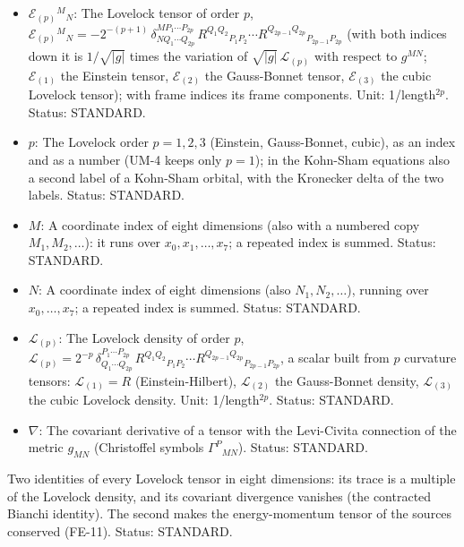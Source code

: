 \documentclass[
  10pt,
]{article}
\providecommand{\tightlist}{%
  \setlength{\itemsep}{0pt}\setlength{\parskip}{0pt}}
\begin{document}
\begin{itemize}
\tightlist
\item
  \(\mathcal{E}_{(p)}{}^M{}_N\): The Lovelock tensor of order \(p\),
  \(\mathcal{E}_{(p)}{}^M{}_N = -2^{-(p+1)}\,\delta^{MP_1\cdots P_{2p}}_{NQ_1\cdots Q_{2p}}\,R^{Q_1Q_2}{}_{P_1P_2}\cdots R^{Q_{2p-1}Q_{2p}}{}_{P_{2p-1}P_{2p}}\)
  (with both indices down it is \(1/\sqrt{\lvert g\rvert}\) times the
  variation of \(\sqrt{\lvert g\rvert}\,\mathcal{L}_{(p)}\) with respect
  to \(g^{MN}\); \(\mathcal{E}_{(1)}\) the Einstein tensor,
  \(\mathcal{E}_{(2)}\) the Gauss-Bonnet tensor, \(\mathcal{E}_{(3)}\)
  the cubic Lovelock tensor); with frame indices its frame components.
  Unit: 1/length\(^{2p}\). Status: STANDARD.
\item
  \(p\): The Lovelock order \(p = 1, 2, 3\) (Einstein, Gauss-Bonnet,
  cubic), as an index and as a number (UM-4 keeps only \(p = 1\)); in
  the Kohn-Sham equations also a second label of a Kohn-Sham orbital,
  with the Kronecker delta of the two labels. Status: STANDARD.
\item
  \(M\): A coordinate index of eight dimensions (also with a numbered
  copy \(M_1, M_2, \dots\)): it runs over \(x_0, x_1, \dots, x_7\); a
  repeated index is summed. Status: STANDARD.
\item
  \(N\): A coordinate index of eight dimensions (also
  \(N_1, N_2, \dots\)), running over \(x_0, \dots, x_7\); a repeated
  index is summed. Status: STANDARD.
\item
  \(\mathcal{L}_{(p)}\): The Lovelock density of order \(p\),
  \(\mathcal{L}_{(p)} = 2^{-p}\,\delta^{P_1\cdots P_{2p}}_{Q_1\cdots Q_{2p}}\,R^{Q_1Q_2}{}_{P_1P_2}\cdots R^{Q_{2p-1}Q_{2p}}{}_{P_{2p-1}P_{2p}}\),
  a scalar built from \(p\) curvature tensors: \(\mathcal{L}_{(1)} = R\)
  (Einstein-Hilbert), \(\mathcal{L}_{(2)}\) the Gauss-Bonnet density,
  \(\mathcal{L}_{(3)}\) the cubic Lovelock density. Unit:
  1/length\(^{2p}\). Status: STANDARD.
\item
  \(\nabla\): The covariant derivative of a tensor with the Levi-Civita
  connection of the metric \(g_{MN}\) (Christoffel symbols
  \(\Gamma^P{}_{MN}\)). Status: STANDARD.
\end{itemize}

Two identities of every Lovelock tensor in eight dimensions: its trace
is a multiple of the Lovelock density, and its covariant divergence
vanishes (the contracted Bianchi identity). The second makes the
energy-momentum tensor of the sources conserved (FE-11). Status:
STANDARD.
\end{document}
